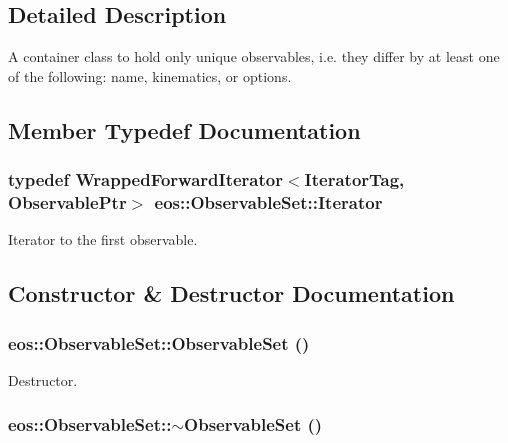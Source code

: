 \subsection{Detailed Description}
A container class to hold only unique observables, i.e. they differ by at least one of the following: name, kinematics, or options. 

\subsection{Member Typedef Documentation}
\hypertarget{classeos_1_1ObservableSet_ab19c0de83857e28065c2fe64b685a005}{
\subsubsection[{Iterator}]{\setlength{\rightskip}{0pt plus 5cm}typedef {\bf WrappedForwardIterator}$<$IteratorTag, {\bf ObservablePtr}$>$ {\bf eos::ObservableSet::Iterator}}}
\label{classeos_1_1ObservableSet_ab19c0de83857e28065c2fe64b685a005}


Iterator to the first observable. 

\subsection{Constructor \& Destructor Documentation}
\hypertarget{classeos_1_1ObservableSet_a964ddde72c32ae5a5e7147fb8b171318}{
\subsubsection[{ObservableSet}]{\setlength{\rightskip}{0pt plus 5cm}eos::ObservableSet::ObservableSet ()}}
\label{classeos_1_1ObservableSet_a964ddde72c32ae5a5e7147fb8b171318}


Destructor. \hypertarget{classeos_1_1ObservableSet_a0321b23307b4b46974634dcd4d73b785}{
\subsubsection[{$\sim$ObservableSet}]{\setlength{\rightskip}{0pt plus 5cm}eos::ObservableSet::$\sim$ObservableSet ()}}
\label{classeos_1_1ObservableSet_a0321b23307b4b46974634dcd4d73b785}


